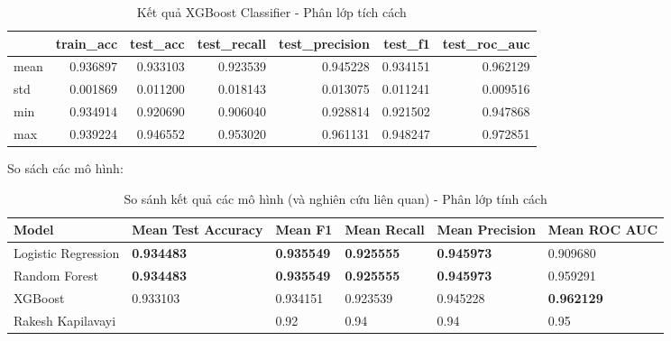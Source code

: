 \begin{itemize}
            \begin{table}[htbp]
                \centering
                \caption{Kết quả XGBoost Classifier - Phân lớp tích cách}
                \label{tab:Behavior-personality-XGBC}
                \begin{tabular}{lrrrrrr}
                \hline
                 & train\_acc & test\_acc & test\_recall & test\_precision & test\_f1 & test\_roc\_auc \\
                \hline
                mean & 0.936897 & 0.933103 & 0.923539 & 0.945228 & 0.934151 & 0.962129 \\
                std & 0.001869 & 0.011200 & 0.018143 & 0.013075 & 0.011241 & 0.009516 \\
                min & 0.934914 & 0.920690 & 0.906040 & 0.928814 & 0.921502 & 0.947868 \\
                max & 0.939224 & 0.946552 & 0.953020 & 0.961131 & 0.948247 & 0.972851 \\
                \hline
                \end{tabular}
            \end{table}

            \FloatBarrier
    \end{itemize}

    So sách các mô hình:

    \begin{table}[htbp]
        \centering
        \caption{So sánh kết quả các mô hình (và nghiên cứu liên quan) - Phân lớp tính cách}
        \label{tab:Behavior-personality-compare}
        \begin{tabular}{|p{2cm}|p{2cm}|p{2cm}|p{2cm}|p{2cm}|p{2cm}|}
            \hline
             Model & Mean Test Accuracy & Mean F1 & Mean Recall & Mean Precision & Mean ROC AUC \\
            \hline
            Logistic Regression & \textbf{0.934483} & \textbf{0.935549} & \textbf{0.925555} & \textbf{0.945973} & 0.909680 \\
            \hline
             Random Forest & \textbf{0.934483} & \textbf{0.935549} & \textbf{0.925555} & \textbf{0.945973} & 0.959291 \\
            \hline
             XGBoost & 0.933103 & 0.934151 & 0.923539 & 0.945228 & \textbf{0.962129} \\
            \hline
             Rakesh Kapilavayi \cite{kapilavayi} &  & 0.92 & 0.94 & 0.94 & 0.95 \\
            \hline
        \end{tabular}
    \end{table}

